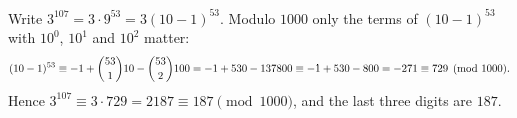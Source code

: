 Write $3^{107}=3\cdot9^{53}=3(10-1)^{53}$. Modulo $1000$ only the terms of $(10-1)^{53}$ with $10^0$, $10^1$ and $10^2$ matter:
\[(10-1)^{53}\equiv-1+\dbinom{53}{1}10-\dbinom{53}{2}100=-1+530-137800\equiv-1+530-800=-271\equiv729\pmod{1000}.\]
Hence $3^{107}\equiv3\cdot729=2187\equiv187\pmod{1000}$, and the last three digits are $\boxed{187}$.
